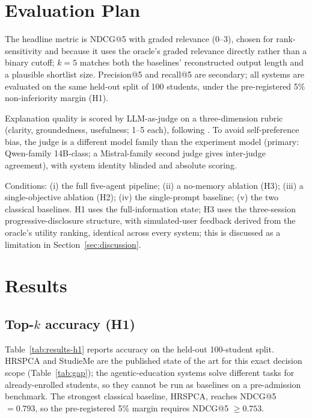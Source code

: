\documentclass[conference]{IEEEtran}
\begin{document}
\section{Evaluation Plan}
\label{sec:evaluation}

The headline metric is NDCG@5 with graded relevance (0--3), chosen for rank-sensitivity and
because it uses the oracle's graded relevance directly rather than a binary cutoff; $k=5$
matches both the baselines' reconstructed output length and a plausible shortlist size.
Precision@5 and recall@5 are secondary; all systems are evaluated on the same held-out
split of 100 students, under the pre-registered 5\% non-inferiority margin (H1).

Explanation quality is scored by LLM-as-judge on a three-dimension rubric (clarity,
groundedness, usefulness; 1--5 each), following \cite{advisingwise}. To avoid
self-preference bias, the judge is a different model family than the experiment model
(primary: Qwen-family 14B-class; a Mistral-family second judge gives inter-judge
agreement), with system identity blinded and absolute scoring.

Conditions: (i) the full five-agent pipeline; (ii) a no-memory ablation (H3); (iii) a
single-objective ablation (H2); (iv) the single-prompt baseline; (v) the two classical
baselines. H1 uses the full-information state; H3 uses the three-session
progressive-disclosure structure, with simulated-user feedback derived from the oracle's
utility ranking, identical across every system; this is discussed as a limitation in
Section~\ref{sec:discussion}.

\section{Results}
\label{sec:results}

\subsection{Top-$k$ accuracy (H1)}

Table~\ref{tab:results-h1} reports accuracy on the held-out 100-student split.
HRSPCA and StudieMe are the published state of the art for this exact decision scope
(Table~\ref{tab:gap}); the agentic-education systems \cite{advisingwise,agenticedurec,
onlinecoursemaskg} solve different tasks for already-enrolled students, so they cannot be run
as baselines on a pre-admission benchmark. The
strongest classical baseline, HRSPCA, reaches NDCG@5 $=0.793$, so the pre-registered 5\%
margin requires NDCG@5 $\geq 0.753$.
\end{document}
